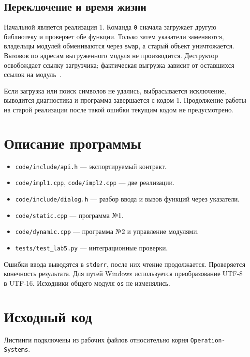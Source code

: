 \subsection{Переключение и время жизни}
Начальной является реализация 1. Команда \texttt{0} сначала загружает другую библиотеку и проверяет обе функции. Только затем указатели заменяются, владельцы модулей обмениваются через \texttt{swap}, а старый объект уничтожается. Вызовов по адресам выгруженного модуля не производится. Деструктор освобождает ссылку загрузчика; фактическая выгрузка зависит от оставшихся ссылок на модуль~\cite{runtime,dlopen}.

Если загрузка или поиск символов не удались, выбрасывается исключение, выводится диагностика и программа завершается с кодом 1. Продолжение работы на старой реализации после такой ошибки текущим кодом не предусмотрено.

\section{Описание программы}
\begin{itemize}
\item \texttt{code/include/api.h} --- экспортируемый контракт.
\item \texttt{code/impl1.cpp}, \texttt{code/impl2.cpp} --- две реализации.
\item \texttt{code/include/dialog.h} --- разбор ввода и вызов функций через указатели.
\item \texttt{code/static.cpp} --- программа №1.
\item \texttt{code/dynamic.cpp} --- программа №2 и управление модулями.
\item \texttt{tests/test\_lab5.py} --- интеграционные проверки.
\end{itemize}
Ошибки ввода выводятся в \texttt{stderr}, после них чтение продолжается. Проверяется конечность результата. Для путей Windows используется преобразование UTF-8 в UTF-16. Исходники общего модуля \texttt{os} не изменялись.

\section{Исходный код}
Листинги подключены из рабочих файлов относительно корня \texttt{Operation-Systems}.







